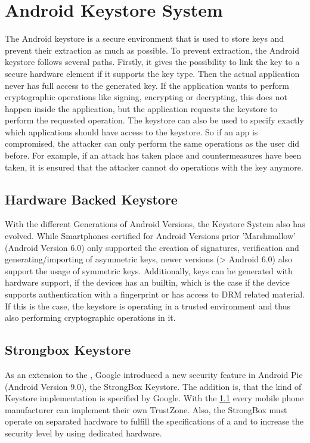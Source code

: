 \documentclass[12pt,oneside,a4paper,parskip]{scrbook}
\begin{document}
\section{Android Keystore System}

The Android keystore is a secure environment that is used to store keys and prevent their extraction as much as possible. To prevent extraction, the Android keystore follows several paths. Firstly, it gives the possibility to link the key to a secure hardware element if it supports the key type. Then the actual application never has full access to the generated key. If the application wants to perform cryptographic operations like signing, encrypting or decrypting, this does not happen inside the application, but the application requests the keystore to perform the requested operation. The keystore can also be used to specify exactly which applications should have access to the keystore. So if an app is compromised, the attacker can only perform the same operations as the user did before. For example, if an attack has taken place and countermeasures have been taken, it is ensured that the attacker cannot do operations with the key anymore. 
\parencite{google_android_2020}

\subsection{Hardware Backed Keystore}
\label{android:HWB}

With the different Generations of Android Versions, the Keystore System also has evolved. While Smartphones certified for Android Versions prior 'Marshmallow' (Android Version 6.0) only supported the creation of signatures, verification and generating/importing of asymmetric keys, newer versions (> Android 6.0) also support the usage of symmetric keys. Additionally, keys can be generated with hardware support, if the devices has an  builtin, which is the case if the device supports authentication with a fingerprint or has access to DRM related material. If this is the case, the keystore is operating in a trusted environment and thus also performing cryptographic operations in it.
\parencite{google_hardware-backed_2020}


\subsection{Strongbox Keystore}

As an extension to the , Google introduced a new security feature in Android Pie (Android Version 9.0), the StrongBox Keystore. The addition is, that the kind of Keystore implementation is specified by Google. With the \ref{android:HWB} every mobile phone manufacturer can implement their own TrustZone. Also, the StrongBox must operate on separated hardware to fulfill the specifications of a  and to increase the security level by using dedicated hardware.
\end{document}
